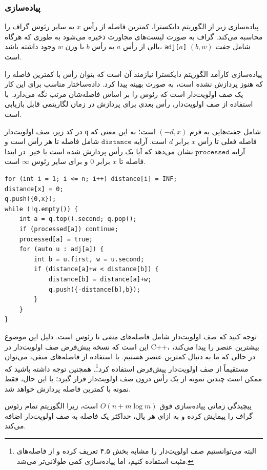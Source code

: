 \subsubsection{پیاده‌سازی}

پیاده‌سازی زیر از الگوریتم دایکسترا،
کمترین فاصله از رأس $x$ به سایر رئوس گراف را محاسبه می‌کند.
گراف به صورت لیست‌های مجاورت ذخیره می‌شود به طوری که هرگاه یالی از رأس $a$ به رأس $b$ با وزن $w$ وجود داشته باشد،
\texttt{adj[$a$]} شامل جفت $(b,w)$ است.

پیاده‌سازی کارآمد الگوریتم دایکسترا نیازمند آن است که بتوان
رأس با کمترین فاصله را که هنوز پردازش نشده است، به صورت بهینه پیدا کرد.
داده‌ساختار مناسب برای این کار یک صف اولویت‌دار است
که رئوس را بر اساس فاصله‌شان مرتب نگه می‌دارد.
با استفاده از صف اولویت‌دار، رأس بعدی برای پردازش در زمان لگاریتمی قابل بازیابی است.

در کد زیر، صف اولویت‌دار \texttt{q} شامل جفت‌هایی به فرم $(-d,x)$ است؛
به این معنی که فاصله فعلی تا رأس $x$ برابر $d$ است.
آرایه $\texttt{distance}$ شامل فاصله تا هر رأس است و آرایه $\texttt{processed}$ نشان می‌دهد که آیا یک رأس پردازش شده است یا خیر.
در ابتدا فاصله تا $x$ برابر $0$ و برای سایر رئوس $\infty$ است.

\begin{lstlisting}
for (int i = 1; i <= n; i++) distance[i] = INF;
distance[x] = 0;
q.push({0,x});
while (!q.empty()) {
    int a = q.top().second; q.pop();
    if (processed[a]) continue;
    processed[a] = true;
    for (auto u : adj[a]) {
        int b = u.first, w = u.second;
        if (distance[a]+w < distance[b]) {
            distance[b] = distance[a]+w;
            q.push({-distance[b],b});
        }
    }
}
\end{lstlisting}

توجه کنید که صف اولویت‌دار شامل فاصله‌های \emph{منفی} تا رئوس است.
دلیل این موضوع این است که نسخه پیش‌فرض صف اولویت‌دار در C++،
بیشترین عنصر را پیدا می‌کند، در حالی که ما به دنبال کمترین عنصر هستیم.
با استفاده از فاصله‌های منفی، می‌توان مستقیماً از صف اولویت‌دار پیش‌فرض استفاده کرد\footnote{البته
می‌توانستیم صف اولویت‌دار را مشابه بخش ۴.۵ تعریف کرده و از فاصله‌های مثبت استفاده کنیم، اما پیاده‌سازی کمی طولانی‌تر می‌شد.}.
همچنین توجه داشته باشید که ممکن است چندین نمونه از یک رأس درون صف اولویت‌دار قرار گیرد؛
با این حال، فقط نمونه با کمترین فاصله پردازش خواهد شد.

پیچیدگی زمانی پیاده‌سازی فوق $O(n+m \log m)$ است،
زیرا الگوریتم تمام رئوس گراف را پیمایش کرده و به ازای هر یال،
حداکثر یک فاصله به صف اولویت‌دار اضافه می‌کند.

